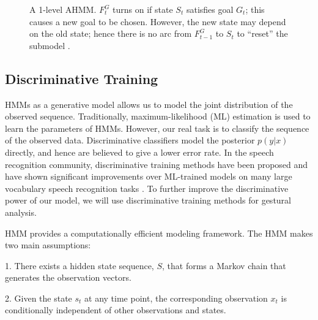 \begin{figure}[h]
\centering
  \caption{A 1-level AHMM. $F_t^G$ turns on if state $S_t$ satisfies goal
  $G_t$; this causes a new goal to be chosen. However, the new state may depend
  on the old state; hence there is no arc from $F_{t-1}^G$ to $S_t$ to
  ``reset'' the submodel \cite{murphy02}.}
  \label{fig:amms}
\end{figure}

\subsection{Discriminative Training}
HMMs as a generative model allows us to model the joint
distribution of the observed sequence. Traditionally,
maximum-likelihood (ML) estimation is used to learn the parameters of HMMs. However, our real task is to
classify the sequence of the observed data. Discriminative classifiers model the
posterior $p(y|x)$ directly, and hence are believed to give a lower error rate.
In the speech recognition community, discriminative training methods have been
proposed and have shown significant improvements over ML-trained models on many
large vocabulary speech recognition tasks \cite {chang12}. To further improve
the discriminative power of our model, we will use discriminative training
methods for gestural analysis.

HMM provides a computationally efficient modeling framework. The HMM makes two
main assumptions:

1. There exists a hidden state sequence, $S$, that forms a Markov chain that
generates the observation vectors.

2. Given the state $s_t$ at any time point, the corresponding observation $x_t$
is conditionally independent of other observations and states.

